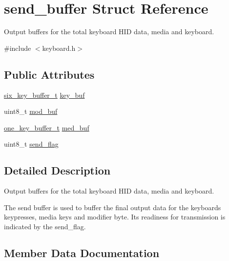 \hypertarget{structsend__buffer}{}\section{send\+\_\+buffer Struct Reference}
\label{structsend__buffer}


Output buffers for the total keyboard H\+ID data, media and keyboard.  




{\ttfamily \#include $<$keyboard.\+h$>$}

\subsection*{Public Attributes}
\begin{DoxyCompactItemize}
\item 
\hyperlink{keyboard_8h_ade7751d5843483b986b63a84a5ea6963}{six\+\_\+key\+\_\+buffer\+\_\+t} \hyperlink{structsend__buffer_a271ff7b0f2d2269b081d21576f388046}{key\+\_\+buf}
\item 
uint8\+\_\+t \hyperlink{structsend__buffer_a1ed1ea0b6d0ffbe2af4f8aff77cd5d56}{mod\+\_\+buf}
\item 
\hyperlink{keyboard_8h_aba6323f912601b5a724db813a53fdcfe}{one\+\_\+key\+\_\+buffer\+\_\+t} \hyperlink{structsend__buffer_a50a00b397fd66c2f36dc607e82a51daf}{med\+\_\+buf}
\item 
uint8\+\_\+t \hyperlink{structsend__buffer_a2584076f9d2f17205d4625411b0d5808}{send\+\_\+flag}
\end{DoxyCompactItemize}


\subsection{Detailed Description}
Output buffers for the total keyboard H\+ID data, media and keyboard. 

The send buffer is used to buffer the final output data for the keyboard\textquotesingle{}s keypresses, media keys and modifier byte. Its readiness for transmission is indicated by the send\+\_\+flag. 

\subsection{Member Data Documentation}
\mbox{\label{structsend__buffer_a271ff7b0f2d2269b081d21576f388046}} 

